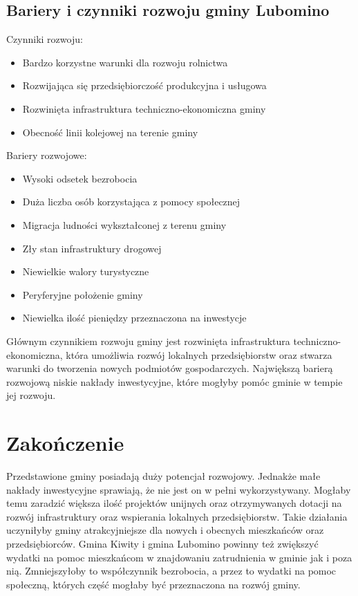 \documentclass[a4paper,10pt]{article}
\begin{document}
  \subsection{Bariery i czynniki rozwoju gminy Lubomino}
    Czynniki rozwoju:
    
    \begin{itemize}
     \item Bardzo korzystne warunki dla rozwoju rolnictwa
     \item Rozwijająca się przedsiębiorczość produkcyjna i usługowa
     \item Rozwinięta infrastruktura techniczno-ekonomiczna gminy
     \item Obecność linii kolejowej na terenie gminy
    \end{itemize}
    
    Bariery rozwojowe:
    \begin{itemize}
     \item Wysoki odsetek bezrobocia
     \item Duża liczba osób korzystająca z pomocy społecznej
     \item Migracja ludności wykształconej z terenu gminy
     \item Zły stan infrastruktury drogowej
     \item Niewielkie walory turystyczne
     \item Peryferyjne położenie gminy
     \item Niewielka ilość pieniędzy przeznaczona na inwestycje
    \end{itemize}
    
    Głównym czynnikiem rozwoju gminy jest rozwinięta infrastruktura techniczno-ekonomiczna, 
    która umożliwia rozwój lokalnych przedsiębiorstw oraz stwarza warunki do tworzenia nowych podmiotów gospodarczych.
    Największą barierą rozwojową niskie nakłady inwestycyjne, które mogłyby pomóc gminie w tempie jej rozwoju.

\newpage    
\section{Zakończenie}
  Przedstawione gminy posiadają duży potencjał rozwojowy. Jednakże małe nakłady inwestycyjne sprawiają, że nie jest on w pełni wykorzystywany. 
  Mogłaby temu zaradzić większa ilość projektów unijnych oraz otrzymywanych dotacji na rozwój infrastruktury oraz wspierania lokalnych przedsiębiorstw. 
  Takie działania uczyniłyby gminy atrakcyjniejsze dla nowych i obecnych mieszkańców oraz przedsiębiorców.
  Gmina Kiwity i gmina Lubomino powinny też zwiększyć wydatki na pomoc mieszkańcom w znajdowaniu zatrudnienia w gminie jak i poza nią. 
  Zmniejszyłoby to współczynnik bezrobocia, a przez to wydatki na pomoc społeczną, których część mogłaby być przeznaczona na rozwój gminy.
\end{document}
